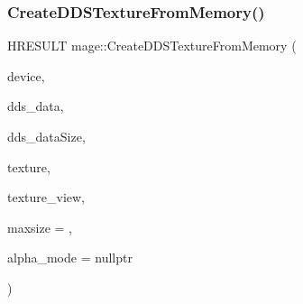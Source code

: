 \subsubsection{\texorpdfstring{Create\+D\+D\+S\+Texture\+From\+Memory()}{CreateDDSTextureFromMemory()}\hspace{0.1cm}{\footnotesize\ttfamily [1/4]}}
{\footnotesize\ttfamily H\+R\+E\+S\+U\+LT mage\+::\+Create\+D\+D\+S\+Texture\+From\+Memory (\begin{DoxyParamCaption}\item[{\+\_\+\+In\+\_\+ I\+D3\+D11\+Device2 $\ast$}]{device,  }\item[{\+\_\+\+In\+\_\+reads\+\_\+bytes\+\_\+(dds\+\_\+data\+Size) const uint8\+\_\+t $\ast$}]{dds\+\_\+data,  }\item[{\+\_\+\+In\+\_\+ size\+\_\+t}]{dds\+\_\+data\+Size,  }\item[{\+\_\+\+Outptr\+\_\+opt\+\_\+ I\+D3\+D11\+Resource $\ast$$\ast$}]{texture,  }\item[{\+\_\+\+Outptr\+\_\+opt\+\_\+ I\+D3\+D11\+Shader\+Resource\+View $\ast$$\ast$}]{texture\+\_\+view,  }\item[{\+\_\+\+In\+\_\+ size\+\_\+t}]{maxsize = {},  }\item[{\+\_\+\+Out\+\_\+opt\+\_\+ \hyperlink{namespacemage_a0c586a2bad862f4858900ca121ca80c2}{D\+D\+S\+\_\+\+A\+L\+P\+H\+A\+\_\+\+M\+O\+DE} $\ast$}]{alpha\+\_\+mode = {\ttfamily nullptr} }\end{DoxyParamCaption})}

\hypertarget{namespacemage_a0f7b5b2cc18c9d007e91397ac7916aad}{}\label{namespacemage_a0f7b5b2cc18c9d007e91397ac7916aad} 
